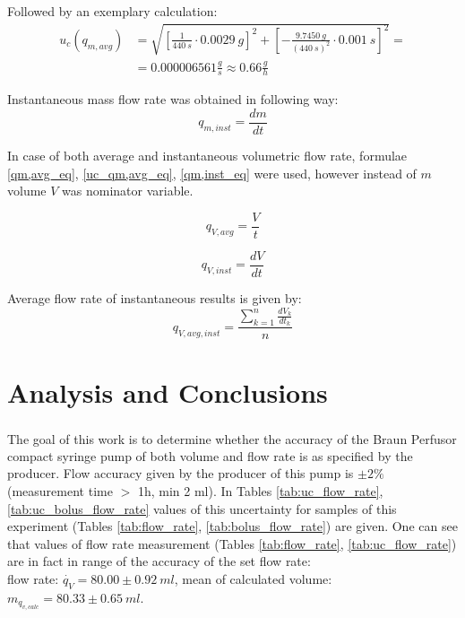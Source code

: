 \documentclass[12pt,a4paper]{article}
\begin{document}
	Followed by an exemplary calculation:
	\begin{equation}\label{uc_qm,avg_eq_eg}
	\begin{split}
		u_c(q_{m,avg}) & = \sqrt{\left[\frac{1}{440~s} \cdot 0.0029~g\right]^2 + \left[-\frac{9.7450~g}{(440~s)^2} \cdot 0.001~s\right]^2} =\\
		& = 0.000006561 \frac{g}{s} \approx 0.66 \frac{g}{h}
	\end{split}
	\end{equation}
	
	Instantaneous mass flow rate was obtained in following way:
	\begin{equation}\label{qm,inst_eq}
		q_{m,inst} = \frac{dm}{dt}
	\end{equation} 
	
	In case of both average and instantaneous volumetric flow rate, formulae \ref{qm,avg_eq}, \ref{uc_qm,avg_eq}, \ref{qm,inst_eq} were used, however instead of $m$ volume $V$ was nominator variable.
	
	\begin{equation}\label{qv,avg_eq}
		q_{V,avg} = \frac{V}{t}
	\end{equation}
	
	\begin{equation}\label{qv,inst_eq}
		q_{V,inst} = \frac{dV}{dt}
	\end{equation}
	
	Average flow rate of instantaneous results is given by:
	\begin{equation}\label{qv,avg,inst_eq}
		q_{V,avg,inst} = \frac{\sum_{k=1}^{n}\frac{dV_k}{dt_k}}{n}
	\end{equation}
	
	
	\section{Analysis and Conclusions}
	
	The goal of this work is to determine whether the accuracy of the Braun Perfusor\textsuperscript{\tiny\textregistered} compact syringe pump of both volume and flow rate is as specified by the producer. Flow accuracy given by the producer of this pump is $\pm 2\%$ (measurement time $>$ 1h, min 2 ml). In Tables \ref{tab:uc_flow_rate}, \ref{tab:uc_bolus_flow_rate} values of this uncertainty for samples of this experiment (Tables \ref{tab:flow_rate}, \ref{tab:bolus_flow_rate}) are given. One can see that values of flow rate measurement (Tables \ref{tab:flow_rate}, \ref{tab:uc_flow_rate}) are in fact in range of the accuracy of the set flow rate: \\
	\indent\indent flow rate: $\dot{q_V} = 80.00 \pm 0.92~ml$, mean of calculated volume: $m_{q_{v,calc}} = 80.33 \pm 0.65~ml$.
	
\end{document}
